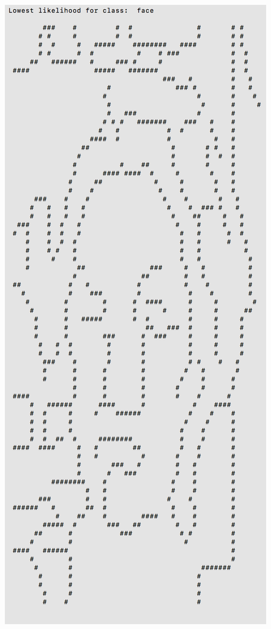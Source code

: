 \documentclass[11pt]{article}
\begin{document}
\begin{center}
\includegraphics[scale=0.6]{part1/extra/low_face.png}
\end{center}
\end{document}
